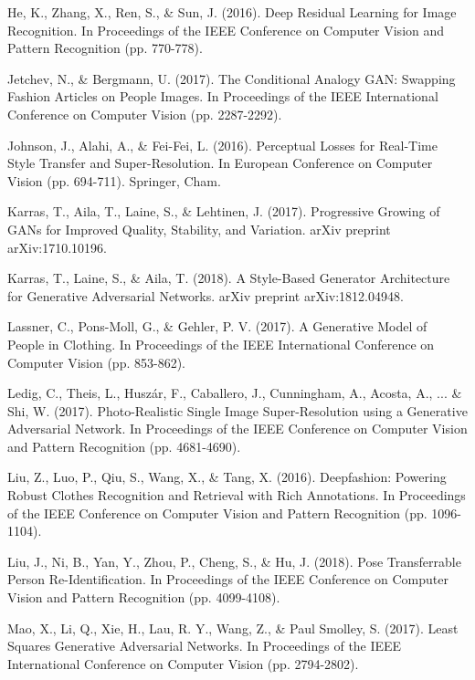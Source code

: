 \documentclass[11pt]{article}
\begin{document}
\begin{thebibliography}{34}
He, K., Zhang, X., Ren, S., \& Sun, J. (2016). Deep Residual Learning for Image Recognition. In Proceedings of the IEEE Conference on Computer Vision and Pattern Recognition (pp. 770-778).

Jetchev, N., \& Bergmann, U. (2017). The Conditional Analogy GAN: Swapping Fashion Articles on People Images. In Proceedings of the IEEE International Conference on Computer Vision (pp. 2287-2292).


Johnson, J., Alahi, A., \& Fei-Fei, L. (2016). Perceptual Losses for Real-Time Style Transfer and Super-Resolution. In European Conference on Computer Vision (pp. 694-711). Springer, Cham.

Karras, T., Aila, T., Laine, S., \& Lehtinen, J. (2017). Progressive Growing of GANs for Improved Quality, Stability, and Variation. arXiv preprint arXiv:1710.10196.


Karras, T., Laine, S., \& Aila, T. (2018). A Style-Based Generator Architecture for Generative Adversarial Networks. arXiv preprint arXiv:1812.04948.


Lassner, C., Pons-Moll, G., \& Gehler, P. V. (2017). A Generative Model of People in Clothing. In Proceedings of the IEEE International Conference on Computer Vision (pp. 853-862).

Ledig, C., Theis, L., Huszár, F., Caballero, J., Cunningham, A., Acosta, A., ... \& Shi, W. (2017). Photo-Realistic Single Image Super-Resolution using a Generative Adversarial Network. In Proceedings of the IEEE Conference on Computer Vision and Pattern Recognition (pp. 4681-4690).

Liu, Z., Luo, P., Qiu, S., Wang, X., \& Tang, X. (2016). Deepfashion: Powering Robust Clothes Recognition and Retrieval with Rich Annotations. In Proceedings of the IEEE Conference on Computer Vision and Pattern Recognition (pp. 1096-1104).

 Liu, J., Ni, B., Yan, Y., Zhou, P., Cheng, S., \& Hu, J. (2018). Pose Transferrable Person Re-Identification. In Proceedings of the IEEE Conference on Computer Vision and Pattern Recognition (pp. 4099-4108).

 Mao, X., Li, Q., Xie, H., Lau, R. Y., Wang, Z., \& Paul Smolley, S. (2017). Least Squares Generative Adversarial Networks. In Proceedings of the IEEE International Conference on Computer Vision (pp. 2794-2802).


\end{thebibliography}
\end{document}
